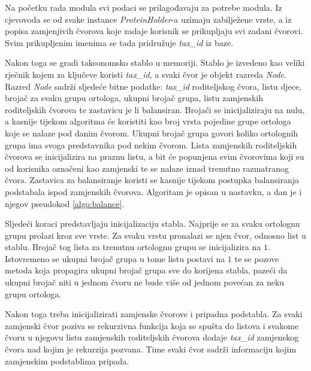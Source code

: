 Na početku rada modula svi podaci se prilagođavaju za potrebe modula. Iz
cjevovoda se od svake instance \emph{ProteinHolder}-a uzimaju zabilježene vrste,
a iz popisa zamjenjivih čvorova koje zadaje korisnik se prikupljaju svi zadani
čvorovi. Svim prikupljenim imenima se tada pridružuje \emph{tax\_id} iz baze.

Nakon toga se gradi taksonomsko stablo u memoriji. Stablo je izvedeno kao veliki
rječnik kojem za ključeve koristi \emph{tax\_id}, a svaki čvor je objekt razreda
\emph{Node}. Razred \emph{Node} sadrži sljedeće bitne podatke: \emph{tax\_id}
roditeljskog čvora, listu djece, brojač za svaku grupu ortologa, ukupni brojač
grupa, listu zamjenskih roditeljskih čvorova te zastavicu je li balansiran.
Brojači se inicijaliziraju na nulu, a kasnije tijekom algoritma će koristiti kao
broj vrsta pojedine grupe ortologa koje se nalaze pod danim čvorom. Ukupni
brojač grupa govori koliko ortolognih grupa ima svoga predstavnika pod nekim
čvorom. Lista zamjenskih roditeljskih čvorova se inicijalizira na praznu listu,
a bit će popunjena svim čvorovima koji su od korisnika označeni kao zamjenski te
se nalaze iznad trenutno razmatranog čvora. Zastavica za balansiranje koristi se
kasnije tijekom postupka balansiranja podstabala ispod zamjenskih čvorova.
Algoritam je opisan u nastavku, a dan je i njegov pseudokod \ref{algo:balance}.

Sljedeći koraci predstavljaju inicijalizaciju stabla. Najprije se za svaku
ortolognu grupu prolazi kroz sve vrste. Za svaku vrstu pronalazi se njen čvor,
odnosno list u stablu. Brojač tog lista za trenutnu ortolognu grupu se
inicijalizira na $1$. Istovremeno se ukupni brojač grupa u tome listu postavi na
$1$ te se pozove metoda koja propagira ukupni brojač grupa sve do korijena
stabla, pazeći da ukupni brojač niti u jednom čvoru ne bude više od jednom
povećan za neku grupu ortologa.

Nakon toga treba inicijalizirati zamjenske čvorove i pripadna podstabla. Za
svaki zamjenski čvor poziva se rekurzivna funkcija koja se spušta do listova i
svakome čvoru u njegovu listu zamjenskih roditeljskih čvorova dodaje
\emph{tax\_id} zamjenskog čvora nad kojim je rekurzija pozvana.  Time svaki čvor
sadrži informaciju kojim zamjenskim podstablima pripada.




